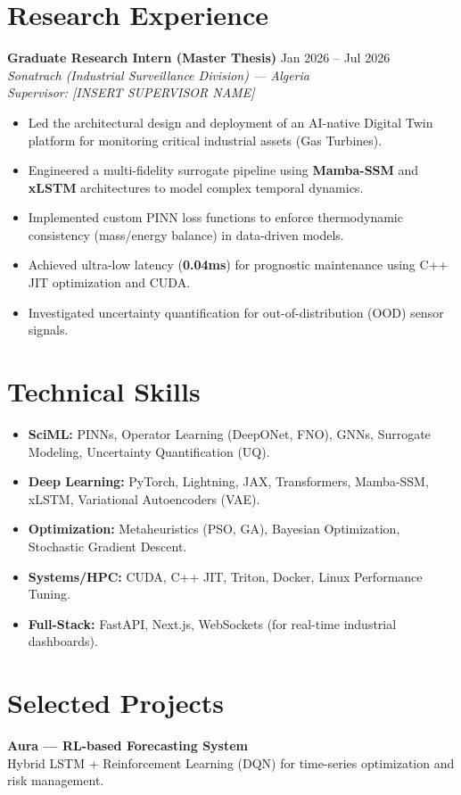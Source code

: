 \documentclass[a4paper,11pt]{article}
\begin{document}
\section{Research Experience}
\textbf{Graduate Research Intern (Master Thesis)} \hfill Jan 2026 -- Jul 2026 \\
\textit{Sonatrach (Industrial Surveillance Division) — Algeria} \\
\textit{Supervisor: [INSERT SUPERVISOR NAME]}
\begin{itemize}
    \item Led the architectural design and deployment of an AI-native Digital Twin platform for monitoring critical industrial assets (Gas Turbines). 
    \item Engineered a multi-fidelity surrogate pipeline using \textbf{Mamba-SSM} and \textbf{xLSTM} architectures to model complex temporal dynamics.
    \item Implemented custom PINN loss functions to enforce thermodynamic consistency (mass/energy balance) in data-driven models.
    \item Achieved ultra-low latency (\textbf{0.04ms}) for prognostic maintenance using C++ JIT optimization and CUDA.
    \item Investigated uncertainty quantification for out-of-distribution (OOD) sensor signals.
\end{itemize}

\section{Technical Skills}
\begin{itemize}
    \item \textbf{SciML:} PINNs, Operator Learning (DeepONet, FNO), GNNs, Surrogate Modeling, Uncertainty Quantification (UQ).
    \item \textbf{Deep Learning:} PyTorch, Lightning, JAX, Transformers, Mamba-SSM, xLSTM, Variational Autoencoders (VAE).
    \item \textbf{Optimization:} Metaheuristics (PSO, GA), Bayesian Optimization, Stochastic Gradient Descent.
    \item \textbf{Systems/HPC:} CUDA, C++ JIT, Triton, Docker, Linux Performance Tuning.
    \item \textbf{Full-Stack:} FastAPI, Next.js, WebSockets (for real-time industrial dashboards).
\end{itemize}

\section{Selected Projects}
\textbf{Aura — RL-based Forecasting System} \\
Hybrid LSTM + Reinforcement Learning (DQN) for time-series optimization and risk management.
\end{document}
